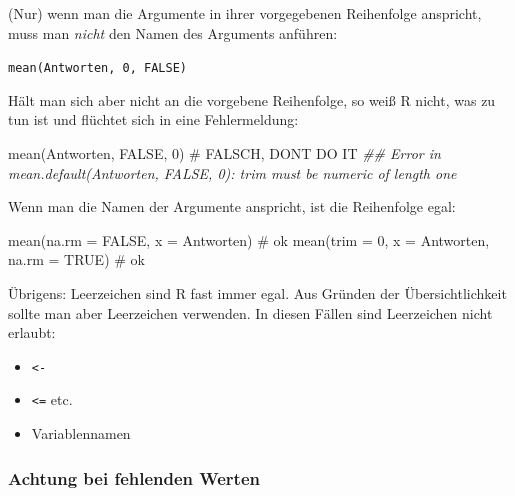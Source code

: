 \documentclass[
  letterpaper,
]{scrbook}
\newenvironment{Shaded}{\begin{snugshade}}{\end{snugshade}}
\newcommand{\AttributeTok}[1]{\textcolor[rgb]{0.40,0.45,0.13}{#1}}
\newcommand{\CommentTok}[1]{\textcolor[rgb]{0.37,0.37,0.37}{#1}}
\newcommand{\ConstantTok}[1]{\textcolor[rgb]{0.56,0.35,0.01}{#1}}
\newcommand{\DecValTok}[1]{\textcolor[rgb]{0.68,0.00,0.00}{#1}}
\newcommand{\DocumentationTok}[1]{\textcolor[rgb]{0.37,0.37,0.37}{\textit{#1}}}
\newcommand{\FunctionTok}[1]{\textcolor[rgb]{0.28,0.35,0.67}{#1}}
\newcommand{\NormalTok}[1]{\textcolor[rgb]{0.00,0.23,0.31}{#1}}
\providecommand{\tightlist}{%
  \setlength{\itemsep}{0pt}\setlength{\parskip}{0pt}}\usepackage{longtable,booktabs,array}
\theoremstyle{definition}
\theoremstyle{definition}
\theoremstyle{definition}
\theoremstyle{remark}
\begin{document}
(Nur) wenn man die Argumente in ihrer vorgegebenen Reihenfolge
anspricht, muss man \emph{nicht} den Namen des Arguments anführen:

 \texttt{mean(Antworten,\ 0,\ FALSE)}

Hält man sich aber nicht an die vorgebene Reihenfolge, so weiß R nicht,
was zu tun ist und flüchtet sich in eine Fehlermeldung:

\begin{Shaded}
\begin{Highlighting}[]
\FunctionTok{mean}\NormalTok{(Antworten, }\ConstantTok{FALSE}\NormalTok{, }\DecValTok{0}\NormalTok{)  }\CommentTok{\# FALSCH, DON\textquotesingle{}T DO IT }
\DocumentationTok{\#\# Error in mean.default(Antworten, FALSE, 0): \textquotesingle{}trim\textquotesingle{} must be numeric of length one}
\end{Highlighting}
\end{Shaded}

Wenn man die Namen der Argumente anspricht, ist die Reihenfolge egal:

\begin{Shaded}
\begin{Highlighting}[]
\FunctionTok{mean}\NormalTok{(}\AttributeTok{na.rm =} \ConstantTok{FALSE}\NormalTok{, }\AttributeTok{x =}\NormalTok{ Antworten)  }\CommentTok{\# ok}
\FunctionTok{mean}\NormalTok{(}\AttributeTok{trim =} \DecValTok{0}\NormalTok{, }\AttributeTok{x =}\NormalTok{ Antworten, }\AttributeTok{na.rm =} \ConstantTok{TRUE}\NormalTok{)  }\CommentTok{\# ok}
\end{Highlighting}
\end{Shaded}

Übrigens: Leerzeichen sind R fast immer egal. Aus Gründen der
Übersichtlichkeit sollte man aber Leerzeichen verwenden. In diesen
Fällen sind Leerzeichen nicht erlaubt:

\begin{itemize}
\tightlist
\item
  \texttt{\textless{}-}
\item
  \texttt{\textless{}=} etc.
\item
  Variablennamen
\end{itemize}

\subsubsection{Achtung bei fehlenden
Werten}\label{achtung-bei-fehlenden-werten}
\end{document}
